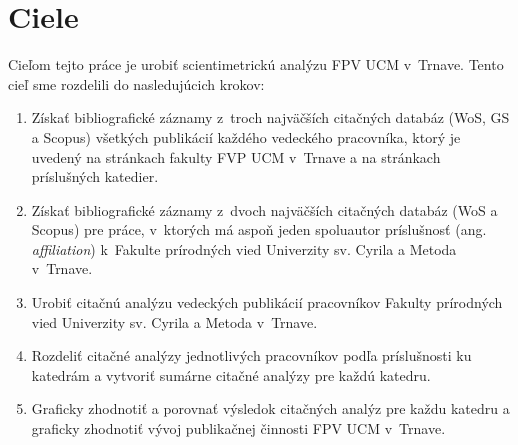 \chapter{Ciele}

Cieľom tejto práce je urobiť scientimetrickú analýzu FPV UCM v~Trnave.  Tento
cieľ sme rozdelili do nasledujúcich krokov:

\begin{enumerate}
\item Získať bibliografické záznamy z~troch najväčších citačných databáz (WoS,
  GS a Scopus) všetkých publikácií každého vedeckého pracovníka, ktorý je
  uvedený na stránkach fakulty FVP UCM v~Trnave a na stránkach príslušných
  katedier.
\item Získať bibliografické záznamy z~dvoch najväčších citačných databáz (WoS a
  Scopus) pre práce, v~ktorých má aspoň jeden spoluautor príslušnosť
  (ang.\,\emph{affiliation}) k~Fakulte prírodných vied Univerzity sv. Cyrila a
  Metoda v~Trnave.
\item Urobiť citačnú analýzu vedeckých publikácií pracovníkov Fakulty prírodných
  vied Univerzity sv. Cyrila a Metoda v~Trnave.
\item Rozdeliť citačné analýzy jednotlivých pracovníkov podľa príslušnosti ku
  katedrám a vytvoriť sumárne citačné analýzy pre každú katedru.
\item Graficky zhodnotiť a porovnať výsledok citačných analýz pre každu katedru
  a graficky zhodnotiť vývoj publikačnej činnosti FPV UCM v~Trnave.
\end{enumerate}


